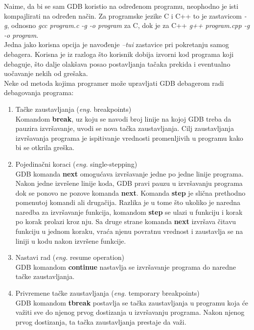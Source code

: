 \documentclass[a4paper]{article}
\begin{document}
Naime, da bi se sam GDB koristio na određenom programu, neophodno je isti kompajlirati 
na određen način. Za programske jezike C i C++ to je zastavicom \textit{-g}, odnosno
\textit{gcc program.c -g -o program} za C, dok je za C++ \textit{g++ program.cpp -g -o program}.\\
Jedna jako korisna opcija je navođenje \textit{--tui} zastavice pri pokretanju samog debagera. 
Korisna je iz razloga što korisnik dobija izvorni kod programa koji debaguje, što dalje olakšava posao postavljanja
tačaka prekida i eventualno uočavanje nekih od grešaka\cite{oReilly}.\\
Neke od metoda kojima programer može upravljati GDB debagerom radi debagovanja programa:
\begin{enumerate}
\item Tačke zaustavljanja (\textit{eng.} breakpoints) \\
Komandom \textbf{break}, uz koju se navodi broj linije na kojoj GDB treba da pauzira izvršavanje, 
uvodi se nova tačka zaustavljanja. Cilj zaustavljanja izvršavanja programa je ispitivanje vrednosti
promenljivih u programu kako bi se otkrila greška.
\item Pojedinačni koraci (\textit{eng.} single-stepping)\\
GDB komanda \textbf{next} omogućava izvršavanje jedne po jedne linije programa. 
Nakon jedne izvršene linije koda, GDB pravi pauzu u izvršavanju programa dok se ponovo ne 
pozove komanda \textbf{next}. Komanda \textbf{step} je slična prethodno pomenutoj 
komandi ali drugačija. Razlika je u tome što ukoliko je naredna naredba za izvršavanje funkcija, 
komandom \textbf{step} se ulazi u funkciju i korak po korak prolazi kroz nju. Sa druge strane 
komanda \textbf{next} izvršava čitavu funkciju u jednom koraku, vraća njenu povratnu 
vrednost i zaustavlja se na liniji u kodu nakon izvršene funkcije.
\item Nastavi rad (\textit{eng.} resume operation)\\
GDB komandom \textbf{continue} nastavlja se izvršavanje programa do naredne tačke zaustavljanja. 
\item Privremene tačke zaustavljanja (\textit{eng.} temporary breakpoints)\\
GDB komandom \textbf{tbreak} postavlja se tačka zaustavljanja u programu koja će važiti 
sve do njenog prvog dostizanja u izvršavanju programa. Nakon njenog prvog dostizanja, 
ta tačka zaustavljanja prestaje da važi. 
\end{enumerate}
\end{document}
